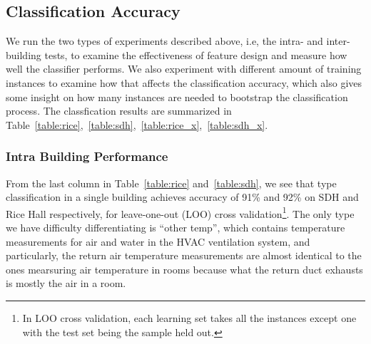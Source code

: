 \subsection{Classification Accuracy}
We run the two types of experiments described above, i.e, the intra- and inter- building tests, to examine the effectiveness of feature design and measure how well 
the classifier performs. We also experiment with different amount of training instances to examine how that affects the classification accuracy, which also gives 
some insight on how many instances are needed to bootstrap the classification process. The classfication results are summarized in Table~\ref{table:rice},~\ref{table:sdh},~\ref{table:rice_x},~\ref{table:sdh_x}.

\subsubsection{Intra Building Performance}
From the last column in Table~\ref{table:rice} and~\ref{table:sdh}, we see that type classification in a single building achieves accuracy of 91\% and 92\% on SDH and Rice Hall respectively, for leave-one-out (LOO) cross validation\footnote{In LOO cross validation, each learning set takes all the instances except one with the test set being the sample held out.}. The only type we have difficulty differentiating is ``other temp'', which contains temperature measurements for air and water in the HVAC ventilation system, and particularly, the return air temperature measurements are almost identical to the ones mearsuring air temperature in rooms because what the return duct exhausts is mostly the air in a room.

